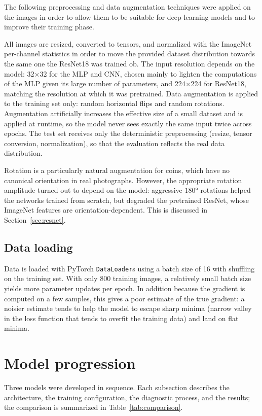 \documentclass[11pt,a4paper]{article}
\begin{document}
The following preprocessing and data augmentation techniques were applied on the images in order to allow them to be suitable for deep learning models and to improve their training phase.

All images are resized, converted to tensors, and normalized with the ImageNet per-channel statistics in order to move the provided dataset distribution towards the same one the ResNet18 was trained ob. The input resolution depends on the model: 32×32 for the MLP and CNN, chosen mainly to lighten the computations of the MLP given its large number of parameters, and 224×224 for ResNet18, matching the resolution at which it was pretrained.
Data augmentation is applied to the training set only: random horizontal flips and
random rotations. Augmentation artificially increases the effective size of a small
dataset and is applied at runtime, so the model never sees exactly the same input twice
across epochs. The test set receives only the deterministic preprocessing (resize,
tensor conversion, normalization), so that the evaluation reflects the real data
distribution.

Rotation is a particularly natural augmentation for coins, which have no canonical
orientation in real photographs. However, the appropriate rotation amplitude turned out
to depend on the model: aggressive $180°$ rotations helped the networks trained
from scratch, but degraded the pretrained ResNet, whose ImageNet features are
orientation-dependent. This is discussed in Section~\ref{sec:resnet}.

\subsection{Data loading}

Data is loaded with PyTorch \texttt{DataLoader}s using a batch size of 16 with shuffling
on the training set. With only 800 training images, a relatively small batch size yields
more parameter updates per epoch. In addition because the gradient is computed on a few samples, this gives a poor estimate of the true gradient: a noisier estimate tends to help the model to escape sharp minima (narrow valley in the loss function that tends to overfit the training data) and land on flat minima.
\section{Model progression}

Three models were developed in sequence. Each subsection describes the architecture,
the training configuration, the diagnostic process, and the results; the comparison is
summarized in Table~\ref{tab:comparison}.
\end{document}

